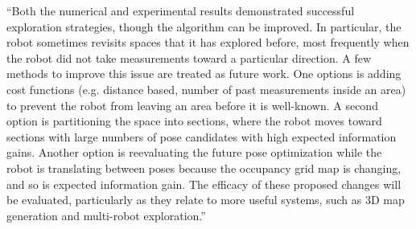 \documentclass[11pt]{article}
\newenvironment{correction}{\begin{list}{}{\setlength{\leftmargin}{1cm}\setlength{\rightmargin}{1cm}}\vspace{\parsep}\item[]``}{''\end{list}}
\begin{document}
\begin{itemize}
\begin{correction}Both the numerical and experimental results demonstrated successful exploration strategies, though the algorithm can be improved. In particular, the robot sometimes revisits spaces that it has explored before, most frequently when the robot did not take measurements toward a particular direction. A few methods to improve this issue are treated as future work. One options is adding cost functions (e.g. distance based, number of past measurements inside an area) to prevent the robot from leaving an area before it is well-known. A second option is partitioning the space into sections, where the robot moves toward sections with large numbers of pose candidates with high expected information gains. Another option is reevaluating the future pose optimization while the robot is translating between poses because the occupancy grid map is changing, and so is expected information gain. The efficacy of these proposed changes will be evaluated, particularly as they relate to more useful systems, such as 3D map generation and multi-robot exploration.\end{correction}


\end{itemize}
\end{document}
